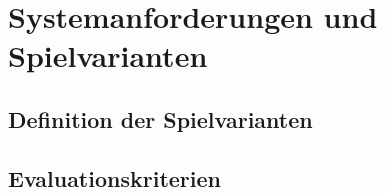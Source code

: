 \chapter{Systemanforderungen und Spielvarianten}

\section{Definition der Spielvarianten}

\section{Evaluationskriterien}

